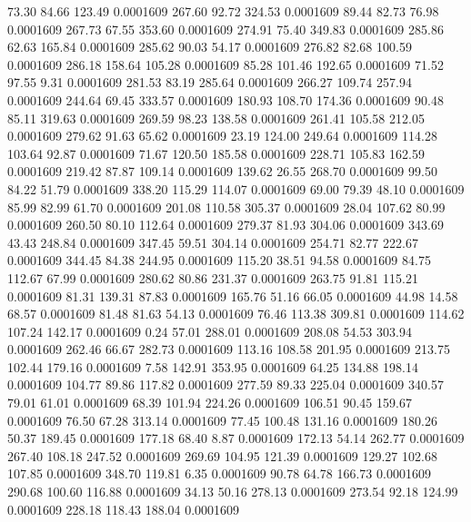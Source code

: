   73.30   84.66  123.49   0.0001609
 267.60   92.72  324.53   0.0001609
  89.44   82.73   76.98   0.0001609
 267.73   67.55  353.60   0.0001609
 274.91   75.40  349.83   0.0001609
 285.86   62.63  165.84   0.0001609
 285.62   90.03   54.17   0.0001609
 276.82   82.68  100.59   0.0001609
 286.18  158.64  105.28   0.0001609
  85.28  101.46  192.65   0.0001609
  71.52   97.55    9.31   0.0001609
 281.53   83.19  285.64   0.0001609
 266.27  109.74  257.94   0.0001609
 244.64   69.45  333.57   0.0001609
 180.93  108.70  174.36   0.0001609
  90.48   85.11  319.63   0.0001609
 269.59   98.23  138.58   0.0001609
 261.41  105.58  212.05   0.0001609
 279.62   91.63   65.62   0.0001609
  23.19  124.00  249.64   0.0001609
 114.28  103.64   92.87   0.0001609
  71.67  120.50  185.58   0.0001609
 228.71  105.83  162.59   0.0001609
 219.42   87.87  109.14   0.0001609
 139.62   26.55  268.70   0.0001609
  99.50   84.22   51.79   0.0001609
 338.20  115.29  114.07   0.0001609
  69.00   79.39   48.10   0.0001609
  85.99   82.99   61.70   0.0001609
 201.08  110.58  305.37   0.0001609
  28.04  107.62   80.99   0.0001609
 260.50   80.10  112.64   0.0001609
 279.37   81.93  304.06   0.0001609
 343.69   43.43  248.84   0.0001609
 347.45   59.51  304.14   0.0001609
 254.71   82.77  222.67   0.0001609
 344.45   84.38  244.95   0.0001609
 115.20   38.51   94.58   0.0001609
  84.75  112.67   67.99   0.0001609
 280.62   80.86  231.37   0.0001609
 263.75   91.81  115.21   0.0001609
  81.31  139.31   87.83   0.0001609
 165.76   51.16   66.05   0.0001609
  44.98   14.58   68.57   0.0001609
  81.48   81.63   54.13   0.0001609
  76.46  113.38  309.81   0.0001609
 114.62  107.24  142.17   0.0001609
   0.24   57.01  288.01   0.0001609
 208.08   54.53  303.94   0.0001609
 262.46   66.67  282.73   0.0001609
 113.16  108.58  201.95   0.0001609
 213.75  102.44  179.16   0.0001609
   7.58  142.91  353.95   0.0001609
  64.25  134.88  198.14   0.0001609
 104.77   89.86  117.82   0.0001609
 277.59   89.33  225.04   0.0001609
 340.57   79.01   61.01   0.0001609
  68.39  101.94  224.26   0.0001609
 106.51   90.45  159.67   0.0001609
  76.50   67.28  313.14   0.0001609
  77.45  100.48  131.16   0.0001609
 180.26   50.37  189.45   0.0001609
 177.18   68.40    8.87   0.0001609
 172.13   54.14  262.77   0.0001609
 267.40  108.18  247.52   0.0001609
 269.69  104.95  121.39   0.0001609
 129.27  102.68  107.85   0.0001609
 348.70  119.81    6.35   0.0001609
  90.78   64.78  166.73   0.0001609
 290.68  100.60  116.88   0.0001609
  34.13   50.16  278.13   0.0001609
 273.54   92.18  124.99   0.0001609
 228.18  118.43  188.04   0.0001609
